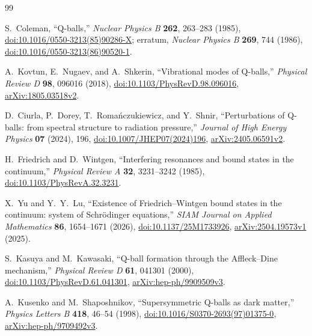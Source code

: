 \begin{thebibliography}{99}

S.~Coleman,
``Q-balls,''
\emph{Nuclear Physics B} \textbf{262}, 263--283 (1985),
\href{https://doi.org/10.1016/0550-3213(85)90286-X}{doi:10.1016/0550-3213(85)90286-X};
erratum, \emph{Nuclear Physics B} \textbf{269}, 744 (1986),
\href{https://doi.org/10.1016/0550-3213(86)90520-1}{doi:10.1016/0550-3213(86)90520-1}.

A.~Kovtun, E.~Nugaev, and A.~Shkerin,
``Vibrational modes of Q-balls,''
\emph{Physical Review D} \textbf{98}, 096016 (2018),
\href{https://doi.org/10.1103/PhysRevD.98.096016}{doi:10.1103/PhysRevD.98.096016},
\href{https://arxiv.org/abs/1805.03518v2}{arXiv:1805.03518v2}.

D.~Ciurla, P.~Dorey, T.~Roma\'nczukiewicz, and Y.~Shnir,
``Perturbations of Q-balls: from spectral structure to radiation pressure,''
\emph{Journal of High Energy Physics} \textbf{07} (2024), 196,
\href{https://doi.org/10.1007/JHEP07(2024)196}{doi:10.1007/JHEP07(2024)196},
\href{https://arxiv.org/abs/2405.06591v2}{arXiv:2405.06591v2}.

H.~Friedrich and D.~Wintgen,
``Interfering resonances and bound states in the continuum,''
\emph{Physical Review A} \textbf{32}, 3231--3242 (1985),
\href{https://doi.org/10.1103/PhysRevA.32.3231}{doi:10.1103/PhysRevA.32.3231}.

X.~Yu and Y.~Y.~Lu,
``Existence of Friedrich--Wintgen bound states in the continuum: system of Schr\"odinger equations,''
\emph{SIAM Journal on Applied Mathematics} \textbf{86}, 1654--1671 (2026),
\href{https://doi.org/10.1137/25M1733926}{doi:10.1137/25M1733926},
\href{https://arxiv.org/abs/2504.19573v1}{arXiv:2504.19573v1} (2025).

S.~Kasuya and M.~Kawasaki,
``Q-ball formation through the Affleck--Dine mechanism,''
\emph{Physical Review D} \textbf{61}, 041301 (2000),
\href{https://doi.org/10.1103/PhysRevD.61.041301}{doi:10.1103/PhysRevD.61.041301},
\href{https://arxiv.org/abs/hep-ph/9909509v3}{arXiv:hep-ph/9909509v3}.

A.~Kusenko and M.~Shaposhnikov,
``Supersymmetric Q-balls as dark matter,''
\emph{Physics Letters B} \textbf{418}, 46--54 (1998),
\href{https://doi.org/10.1016/S0370-2693(97)01375-0}{doi:10.1016/S0370-2693(97)01375-0},
\href{https://arxiv.org/abs/hep-ph/9709492v3}{arXiv:hep-ph/9709492v3}.


\end{thebibliography}
